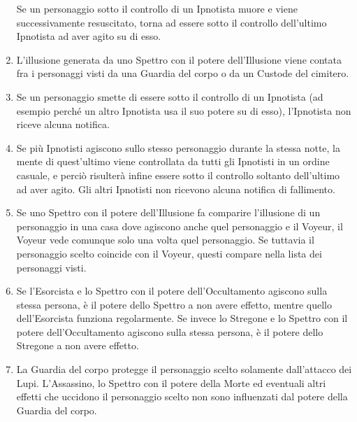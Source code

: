 \documentclass[a4paper,10pt]{article}
\begin{document}
\begin{enumerate}
 Se un personaggio sotto il controllo di un Ipnotista muore e viene successivamente resuscitato, torna ad essere sotto il controllo dell'ultimo Ipnotista ad aver agito su di esso.
 
 \item L'illusione generata da uno Spettro con il potere dell'Illusione viene contata fra i personaggi visti da una Guardia del corpo o da un Custode del cimitero.
 
 \item Se un personaggio smette di essere sotto il controllo di un Ipnotista (ad esempio perché un altro Ipnotista usa il suo potere su di esso), l'Ipnotista non riceve alcuna notifica.
 
 \item Se più Ipnotisti agiscono sullo stesso personaggio durante la stessa notte, la mente di quest'ultimo viene controllata da tutti gli Ipnotisti in un ordine casuale, e perciò risulterà infine essere sotto il controllo soltanto dell'ultimo ad aver agito. Gli altri Ipnotisti non ricevono alcuna notifica di fallimento.
 
 \item Se uno Spettro con il potere dell'Illusione fa comparire l'illusione di un personaggio in una casa dove agiscono anche quel personaggio e il Voyeur, il Voyeur vede comunque solo una volta quel personaggio. Se tuttavia il personaggio scelto coincide con il Voyeur, questi compare nella lista dei personaggi visti.

 \item Se l'Esorcista e lo Spettro con il potere dell'Occultamento agiscono sulla stessa persona, è il potere dello Spettro a non avere effetto, mentre quello dell'Esorcista funziona regolarmente. Se invece lo Stregone e lo Spettro con il potere dell'Occultamento agiscono sulla stessa persona, è il potere dello Stregone a non avere effetto.
 
 \item La Guardia del corpo protegge il personaggio scelto solamente dall'attacco dei Lupi. L'Assassino, lo Spettro con il potere della Morte ed eventuali altri effetti che uccidono il personaggio scelto non sono influenzati dal potere della Guardia del corpo.
 

\end{enumerate}
\end{document}
